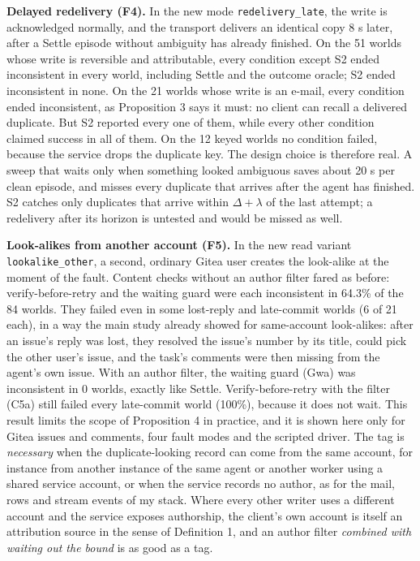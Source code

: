 \documentclass[
  10pt,
]{article}
\begin{document}
\textbf{Delayed redelivery (F4).} In the new mode
\texttt{redelivery\_late}, the write is acknowledged normally, and the
transport delivers an identical copy 8 s later, after a Settle episode
without ambiguity has already finished. On the 51 worlds whose write is
reversible and attributable, every condition except S2 ended
inconsistent in every world, including Settle and the outcome oracle; S2
ended inconsistent in none. On the 21 worlds whose write is an e-mail,
every condition ended inconsistent, as Proposition 3 says it must: no
client can recall a delivered duplicate. But S2 reported every one of
them, while every other condition claimed success in all of them. On the
12 keyed worlds no condition failed, because the service drops the
duplicate key. The design choice is therefore real. A sweep that waits
only when something looked ambiguous saves about 20 s per clean episode,
and misses every duplicate that arrives after the agent has finished. S2
catches only duplicates that arrive within \(\Delta + \lambda\) of the
last attempt; a redelivery after its horizon is untested and would be
missed as well.

\textbf{Look-alikes from another account (F5).} In the new read variant
\texttt{lookalike\_other}, a second, ordinary Gitea user creates the
look-alike at the moment of the fault. Content checks without an author
filter fared as before: verify-before-retry and the waiting guard were
each inconsistent in 64.3\% of the 84 worlds. They failed even in some
lost-reply and late-commit worlds (6 of 21 each), in a way the main
study already showed for same-account look-alikes: after an issue's
reply was lost, they resolved the issue's number by its title, could
pick the other user's issue, and the task's comments were then missing
from the agent's own issue. With an author filter, the waiting guard
(Gwa) was inconsistent in 0 worlds, exactly like Settle.
Verify-before-retry with the filter (C5a) still failed every late-commit
world (100\%), because it does not wait. This result limits the scope of
Proposition 4 in practice, and it is shown here only for Gitea issues
and comments, four fault modes and the scripted driver. The tag is
\emph{necessary} when the duplicate-looking record can come from the
same account, for instance from another instance of the same agent or
another worker using a shared service account, or when the service
records no author, as for the mail, rows and stream events of my stack.
Where every other writer uses a different account and the service
exposes authorship, the client's own account is itself an attribution
source in the sense of Definition 1, and an author filter \emph{combined
with waiting out the bound} is as good as a tag.
\end{document}
